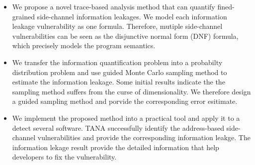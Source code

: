 \begin{itemize}
	\item We propose a novel trace-based analysis method that can quantify fined-grained side-channel
        information leakages. We model each information leakage vulnerability as one formula. Therefore,
        mutiple side-channel vulnerabilities can be seen as the disjunctive normal form (DNF) formula, which
        precisely models the program semantics.
        \item We transfer the information quantification problem into a probabilty distribution problem and 
        use guided Monte Carlo sampling method to estimate the information leakage. Some initial results indicate the 
        the sampling method suffers from the curse of dimensionality. We therefore design a guided
        sampling method and porvide the corresponding error esitimate.
	\item We implement the proposed method into a practical tool and apply it to a detect several software. TANA 
        successfully identify the address-based side-channel vulnerabilities and provide the corresponding
        information leakge. The information lekage result provide the detailed information that help developers
        to fix the vulnerability.
\end{itemize}



